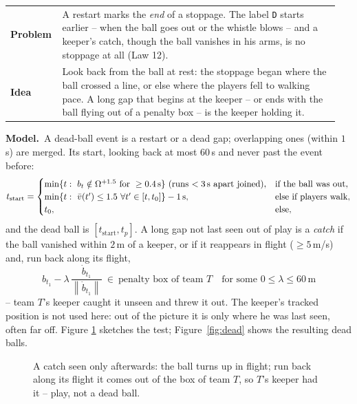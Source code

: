 \documentclass[11pt,a4paper]{article}
\makeatletter
\newcommand{\triple}[3]{%
  \par\medskip\noindent
  \begin{tabular}{@{}p{0.13\linewidth}@{\hspace{0.6em}}p{0.82\linewidth}@{}}
  \textbf{Problem} & #1\\[0.3em]
  \textbf{Idea}    & #2
  \end{tabular}\par\smallskip\noindent
  \textbf{Model.}\ #3\par\medskip}
\newcommand{\norm}[1]{\left\lVert #1 \right\rVert}
\makeatother
\begin{document}
\triple{A restart marks the \emph{end} of a stoppage. The label \texttt{D} starts earlier --
when the ball goes out or the whistle blows -- and a keeper's catch, though the ball vanishes
in his arms, is no stoppage at all (Law 12).}
{Look back from the ball at rest: the stoppage began where the ball crossed a line, or else
where the players fell to walking pace. A long gap that begins at the keeper -- or ends with
the ball flying out of a penalty box -- is the keeper holding it.}
{A dead-ball event is a restart or a dead gap; overlapping ones (within $1$\,s) are merged.
Its start, looking back at most $60$\,s and never past the event before:
\begin{equation}
 t_{\text{start}}=
 \begin{cases}
  \min\{t:\ b_t\notin\Omega^{+1.5}\ \text{for}\ \ge0.4\,\text{s}\}\ \text{(runs $<3$\,s apart joined)}, & \text{if the ball was out},\\
  \min\{t:\ \bar v(t')\le 1.5\ \forall t'\in[t,t_0]\}-1\,\text{s}, & \text{else if players walk},\\
  t_0, & \text{else},
 \end{cases}
\end{equation}
and the dead ball is $[t_{\text{start}},t_p]$. A long gap not last seen out of play is a
\emph{catch} if the ball vanished within $2$\,m of a keeper, or if it reappears in flight
($\ge 5$\,m/s) and, run back along its flight,
\begin{equation}
 b_{t_1}-\lambda\,\frac{\dot b_{t_1}}{\norm{\dot b_{t_1}}}\ \in\ \text{penalty box of team }T
 \quad\text{for some }0\le\lambda\le 60\,\text{m}
\end{equation}
-- team $T$'s keeper caught it unseen and threw it out. The keeper's tracked position is not
used here: out of the picture it is only where he was last seen, often far off. Figure
\ref{fig:catch} sketches the test; Figure~\ref{fig:dead} shows the resulting dead balls.}

\begin{figure}[ht]
\centering
{}
\caption{A catch seen only afterwards: the ball turns up in flight; run back along its flight
it comes out of the box of team $T$, so $T$'s keeper had it -- play, not a dead ball.}
\label{fig:catch}
\end{figure}
\end{document}
